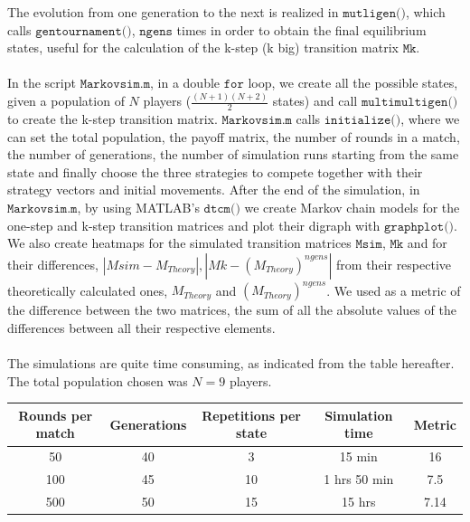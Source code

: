 \documentclass[12pt]{article}
\begin{document}
The evolution from one generation to the next is realized in $\texttt{mutligen()}$, which calls $\texttt{gentournament()}$, $\texttt{ngens}$ times in order to obtain the final equilibrium states, useful for the calculation of the k-step (k big) transition matrix $\texttt{Mk}$.
\\\\
In the script $\texttt{Markovsim.m}$, in a double $\texttt{for}$ loop, we create all the possible states, given a population of $N$ players ($\frac{(N+1)(N+2)}{2}$ states) and call $\texttt{multimultigen()}$ to create the k-step transition matrix. $\texttt{Markovsim.m}$ calls $\texttt{initialize()}$, where we can set the total population, the payoff matrix, the number of rounds in a match, the number of generations, the number of simulation runs starting from the same state and finally choose the three strategies to compete together with their strategy vectors and initial movements. After the end of the simulation, in $\texttt{Markovsim.m}$, by using MATLAB's $\texttt{dtcm()}$ we create Markov chain models for the one-step and k-step transition matrices and plot their digraph with $\texttt{graphplot()}$. We also create heatmaps for the simulated transition matrices $\texttt{Msim}$, $\texttt{Mk}$ and for their differences, $|Msim-M_{Theory}|, |Mk-{(M_{Theory})}^{ngens}|$ from their respective theoretically calculated ones, $M_{Theory}$ and ${(M_{Theory})}^{ngens}$. We used as a metric of the difference between the two matrices, the sum of all the absolute values of the differences between all their respective elements.
\\\\
The simulations are quite time consuming, as indicated from the table hereafter. The total population chosen was $N=9$ players.

\begin{center}
\begin{tabular}{|c|c|c|c|c|}
 \hline
 Rounds per match & Generations & Repetitions per state & Simulation time & Metric \\ 
 \hline
50 & 40 & 3 & 15 min & 16 \\
 \hline
100 &   45 & 10 & 1 hrs 50 min & 7.5 \\
 \hline
500 & 50 & 15 & 15 hrs & 7.14 \\
 \hline
\end{tabular}
\end{center}
\end{document}
